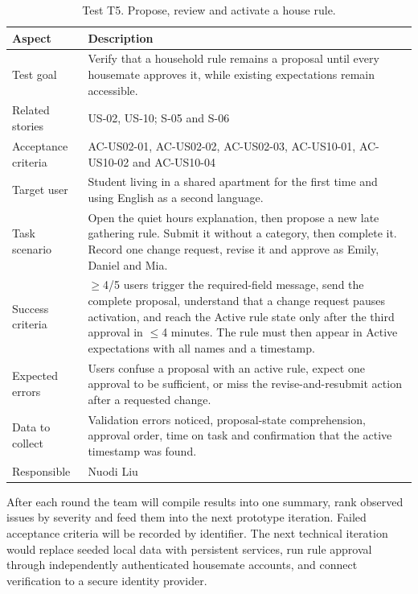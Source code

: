 \documentclass[11pt,a4paper]{article}
\begin{document}
\begin{table}[H]
    \centering
    \small
    \caption{Test T5. Propose, review and activate a house rule.}
    \begin{tabularx}{\textwidth}{@{}L{3.4cm}Y@{}}
        \toprule
        Aspect & Description\\
        \midrule
        Test goal & Verify that a household rule remains a proposal until every housemate approves it, while existing expectations remain accessible.\\
        Related stories & US-02, US-10; S-05 and S-06\\
        Acceptance criteria & AC-US02-01, AC-US02-02, AC-US02-03, AC-US10-01, AC-US10-02 and AC-US10-04\\
        Target user & Student living in a shared apartment for the first time and using English as a second language.\\
        Task scenario & Open the quiet hours explanation, then propose a new late gathering rule. Submit it without a category, then complete it. Record one change request, revise it and approve as Emily, Daniel and Mia.\\
        Success criteria & $\geq$4/5 users trigger the required-field message, send the complete proposal, understand that a change request pauses activation, and reach the Active rule state only after the third approval in $\leq$4 minutes. The rule must then appear in Active expectations with all names and a timestamp.\\
        Expected errors & Users confuse a proposal with an active rule, expect one approval to be sufficient, or miss the revise-and-resubmit action after a requested change.\\
        Data to collect & Validation errors noticed, proposal-state comprehension, approval order, time on task and confirmation that the active timestamp was found.\\
        Responsible & Nuodi Liu\\
        \bottomrule
    \end{tabularx}
    \label{tabtestt5}
\end{table}

After each round the team will compile results into one summary, rank observed issues by severity and feed them into the next prototype iteration. Failed acceptance criteria will be recorded by identifier. The next technical iteration would replace seeded local data with persistent services, run rule approval through independently authenticated housemate accounts, and connect verification to a secure identity provider.
\end{document}
